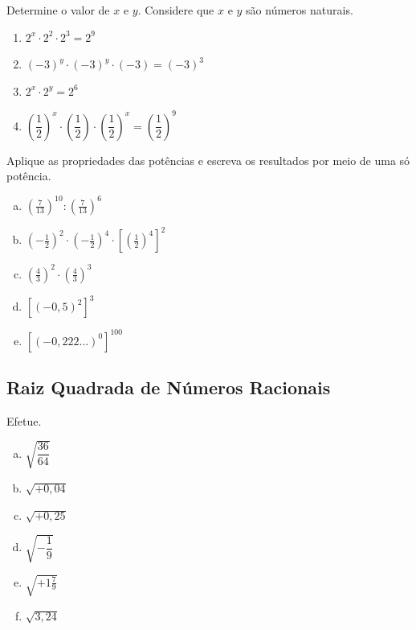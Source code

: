 \item Determine o valor de $x$ e $y$. Considere que $x$ e $y$ são números naturais.
\begin{enumerate}
	\item $2^x \cdot 2^2 \cdot 2^3 = 2^9$
	\item $(-3)^y \cdot (-3)^y \cdot (-3) = (-3)^3$
	\item $2^x \cdot 2^y = 2^6$
	\item $\left(\dfrac{1}{2}\right)^x \cdot \left(\dfrac{1}{2}\right) \cdot \left(\dfrac{1}{2}\right)^x = \left(\dfrac{1}{2}\right)^9$
\end{enumerate}

\item Aplique as propriedades das potências e escreva os resultados por meio de uma só potência.
\begin{multicols}{2}
\begin{enumerate}[a)]
	\item $\left(\displaystyle\frac{7}{13}\right)^{10}:\left(\displaystyle\frac{7}{13}\right)^6$
	\item $\left(-\displaystyle\frac{1}{2}\right)^2\cdot \left(-\displaystyle\frac{1}{2}\right)^4 \cdot \left[ \left( \displaystyle\frac{1}{2}\right)^4 \right]^2$
	\item $\left(\displaystyle\frac{4}{3}\right)^2\cdot\left(\displaystyle\frac{4}{3}\right)^3$
	\item $\left[\left( -0,5\right)^2\right]^3$
	\item $\left[\left( -0,222...\right)^0\right]^{100}$
\end{enumerate}
\end{multicols}


\subsection{Raiz Quadrada de Números Racionais}


\item Efetue.
\begin{multicols}{3}
\begin{enumerate}[a)]
	\item $\sqrt{\dfrac{36}{64}}$
	\item $\sqrt{+0,04}$
	\item $\sqrt{+0,25}$
	\item $\sqrt{-\dfrac{1}{9}}$
	\item $\sqrt{+1\frac{7}{9}}$
	\item $\sqrt{3,24}$
\end{enumerate}
\end{multicols}

